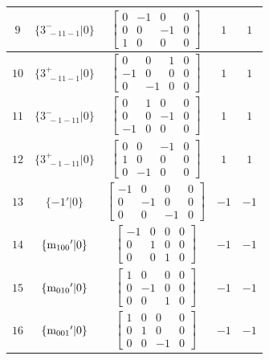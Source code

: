 \documentclass[fleqn,8pt]{jsarticle}
\begin{document}
\begin{longtable}{ccccc}
$ 9 $ & $ \{3^{-}_{\,\,-11-1}|0\} $ & $ \begin{bmatrix} 0 & -1 & 0 & 0 \\ 0 & 0 & -1 & 0 \\ 1 & 0 & 0 & 0 \end{bmatrix} $ & $ 1 $ & $ 1 $ \\ \hline
$ 10 $ & $ \{3^{+}_{\,\,-11-1}|0\} $ & $ \begin{bmatrix} 0 & 0 & 1 & 0 \\ -1 & 0 & 0 & 0 \\ 0 & -1 & 0 & 0 \end{bmatrix} $ & $ 1 $ & $ 1 $ \\ \hline
$ 11 $ & $ \{3^{-}_{\,\,-1-11}|0\} $ & $ \begin{bmatrix} 0 & 1 & 0 & 0 \\ 0 & 0 & -1 & 0 \\ -1 & 0 & 0 & 0 \end{bmatrix} $ & $ 1 $ & $ 1 $ \\ \hline
$ 12 $ & $ \{3^{+}_{\,\,-1-11}|0\} $ & $ \begin{bmatrix} 0 & 0 & -1 & 0 \\ 1 & 0 & 0 & 0 \\ 0 & -1 & 0 & 0 \end{bmatrix} $ & $ 1 $ & $ 1 $ \\ \hline
$ 13 $ & $ \{-1{}'|0\} $ & $ \begin{bmatrix} -1 & 0 & 0 & 0 \\ 0 & -1 & 0 & 0 \\ 0 & 0 & -1 & 0 \end{bmatrix} $ & $ -1 $ & $ -1 $ \\ \hline
$ 14 $ & $ \{{\rm m}_{100}{}'|0\} $ & $ \begin{bmatrix} -1 & 0 & 0 & 0 \\ 0 & 1 & 0 & 0 \\ 0 & 0 & 1 & 0 \end{bmatrix} $ & $ -1 $ & $ -1 $ \\ \hline
$ 15 $ & $ \{{\rm m}_{010}{}'|0\} $ & $ \begin{bmatrix} 1 & 0 & 0 & 0 \\ 0 & -1 & 0 & 0 \\ 0 & 0 & 1 & 0 \end{bmatrix} $ & $ -1 $ & $ -1 $ \\ \hline
$ 16 $ & $ \{{\rm m}_{001}{}'|0\} $ & $ \begin{bmatrix} 1 & 0 & 0 & 0 \\ 0 & 1 & 0 & 0 \\ 0 & 0 & -1 & 0 \end{bmatrix} $ & $ -1 $ & $ -1 $ \\ \hline

\end{longtable}
\end{document}
